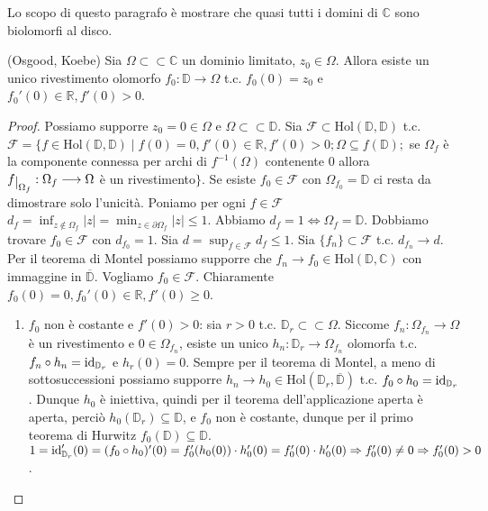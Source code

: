 Lo scopo di questo paragrafo è mostrare che quasi tutti i domini di $\mathbb{C}$ sono biolomorfi al disco.

\begin{thm}
  (Osgood, Koebe) Sia $\Omega \subset \subset \mathbb{C}$ un dominio limitato, $z_0 \in \Omega$. Allora esiste un unico rivestimento olomorfo $f_0:\mathbb{D} \longrightarrow \Omega$ t.c. $f_0(0)=z_0$ e $f_0'(0) \in \mathbb{R}, f'(0)>0$.
\end{thm}

\begin{proof}
  Possiamo supporre $z_0=0 \in \Omega$ e $\Omega \subset \subset \mathbb{D}$. Sia $\mathcal{F} \subset \text{Hol}(\mathbb{D}, \mathbb{D})$ t.c.
  $\mathcal{F}=\{f \in \text{Hol}(\mathbb{D}, \mathbb{D}) \mid f(0)=0, f'(0) \in \mathbb{R}, f'(0)>0; \Omega \subseteq f(\mathbb{D});$ se $\Omega_f$ è la componente connessa per archi di $f^{-1}(\Omega)$ contenente $0$ allora $f\restrict{\Omega_f}:\Omega_f \longrightarrow \Omega$ è un rivestimento$\}$.
  Se esiste $f_0 \in \mathcal{F}$ con $\Omega_{f_0}=\mathbb{D}$ ci resta da dimostrare solo l'unicità. Poniamo per ogni $f \in \mathcal{F}$ $\displaystyle d_f=\inf_{z \not\in \Omega_f} |z|=\min_{z \in \partial\Omega_f} |z| \le 1$. Abbiamo $d_f=1 \iff \Omega_f=\mathbb{D}$.
  Dobbiamo trovare $f_0 \in \mathcal{F}$ con $d_{f_0}=1$. Sia $\displaystyle d=\sup_{f \in \mathcal{F}} d_f \le 1$. Sia $\{f_n\} \subset \mathcal{F}$ t.c. $d_{f_n} \longrightarrow d$.
  Per il teorema di Montel possiamo supporre che $f_n \longrightarrow f_0 \in \text{Hol}(\mathbb{D}, \mathbb{C})$ con immaggine in $\overline {\mathbb{D}}$. Vogliamo $f_0 \in \mathcal{F}$. Chiaramente $f_0(0)=0, f_0'(0) \in \mathbb{R}, f'(0) \ge 0$.
  \begin{enumerate}
    \item $f_0$ non è costante e $f'(0)>0$: sia $r>0$ t.c. $\mathbb{D}_r \subset \subset \Omega$. Siccome $f_n:\Omega_{f_n} \longrightarrow \Omega$ è un rivestimento e $0 \in \Omega_{f_n}$, esiste un unico $h_n:\mathbb{D}_r \longrightarrow \Omega_{f_n}$ olomorfa t.c. $f_n \circ h_n=\operatorname{id}_{\mathbb{D}_r}$ e $h_r(0)=0$.
    Sempre per il teorema di Montel, a meno di sottosuccessioni possiamo supporre $h_n \longrightarrow h_0 \in \text{Hol}(\mathbb{D}_r, \overline{\mathbb{D}})$ t.c. $f_0 \circ h_0=\operatorname{id}_{\mathbb{D}_r}$.
    Dunque $h_0$ è iniettiva, quindi per il teorema dell'applicazione aperta è aperta, perciò $h_0(\mathbb{D}_r) \subseteq \mathbb{D}$, e $f_0$ non è costante, dunque per il primo teorema di Hurwitz $f_0(\mathbb{D}) \subseteq \mathbb{D}$. $1=\operatorname{id}_{\mathbb{D}_r}'(0)=(f_0 \circ h_0)'(0)=f_0'(h_0(0))\cdot h_0'(0)=f_0'(0) \cdot h_0'(0) \Rightarrow f_0'(0) \not=0 \Rightarrow f_0'(0)>0$.

\end{enumerate}
\end{proof}
